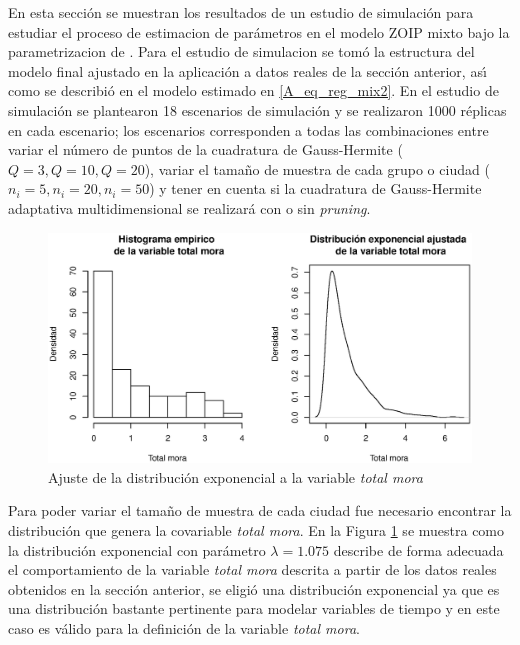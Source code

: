 En esta secci\'{o}n se muestran los resultados de un estudio de simulaci\'{o}n para estudiar el proceso de estimacion de par\'{a}metros en el modelo ZOIP mixto bajo la parametrizacion de \cite{Stasinopoulos2}. Para el estudio de simulacion se tom\'{o} la estructura del modelo final ajustado en la aplicaci\'{o}n a datos reales de la secci\'{o}n anterior, as\'{\i} como se des\-cri\-bi\'{o} en el modelo estimado en \eqref{A_eq_reg_mix2}. En el estudio de simulaci\'{o}n se plantearon 18 escenarios de simulaci\'{o}n y se realizaron 1000 r\'{e}plicas en cada escenario; los escenarios corresponden a todas las combinaciones entre variar el n\'{u}mero de puntos de la cuadratura de Gauss-Hermite ($Q=3 , Q=10, Q=20$), variar el tama\~{n}o de muestra de cada grupo o ciudad ($n_i=5, n_i=20, n_i=50$) y tener en cuenta si la cuadratura de Gauss-Hermite adaptativa multidimensional se realizar\'{a} con o sin \textit{pruning}.\\

\begin{figure}
	\begin{center}
		\includegraphics[scale=0.6]{Ajuste_expo_mix.eps}	
		\caption{Ajuste de la distribuci\'{o}n exponencial a la variable \textsl{total mora}}
		\label{Ajuste_expo_mix}
	\end{center}
\end{figure}

Para poder variar el tama\~{n}o de muestra de cada ciudad fue necesario encontrar la distribuci\'{o}n que genera la covariable \textsl{total mora}. En la Figura \ref{Ajuste_expo_mix} se muestra como la distribuci\'{o}n exponencial con par\'{a}metro $\lambda=1.075$ describe de forma adecuada el comportamiento de la variable \textsl{total mora} descrita a partir de los datos reales obtenidos en la secci\'{o}n anterior, se eligi\'{o} una distribuci\'{o}n exponencial ya que es una distribuci\'{o}n bastante pertinente para modelar variables de tiempo y en este caso es v\'{a}lido para la definici\'{o}n de la variable \textsl{total mora}.\\

